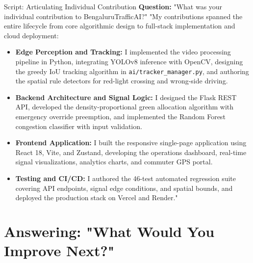 \begin{interviewq}{Script: Articulating Individual Contribution}
\textbf{Question:} "What was your individual contribution to BengaluruTrafficAI?"
\tcblower
"My contributions spanned the entire lifecycle from core algorithmic design to full-stack implementation and cloud deployment:

\begin{itemize}
    \item \textbf{Edge Perception and Tracking:} I implemented the video processing pipeline in Python, integrating YOLOv8 inference with OpenCV, designing the greedy IoU tracking algorithm in \texttt{ai/tracker\_manager.py}, and authoring the spatial rule detectors for red-light crossing and wrong-side driving.
    \item \textbf{Backend Architecture and Signal Logic:} I designed the Flask REST API, developed the density-proportional green allocation algorithm with emergency override preemption, and implemented the Random Forest congestion classifier with input validation.
    \item \textbf{Frontend Application:} I built the responsive single-page application using React 18, Vite, and Zustand, developing the operations dashboard, real-time signal visualizations, analytics charts, and commuter GPS portal.
    \item \textbf{Testing and CI/CD:} I authored the 46-test automated regression suite covering API endpoints, signal edge conditions, and spatial bounds, and deployed the production stack on Vercel and Render."
\end{itemize}
\end{interviewq}

\section{Answering: "What Would You Improve Next?"}
\label{sec:script_future_improvements}

